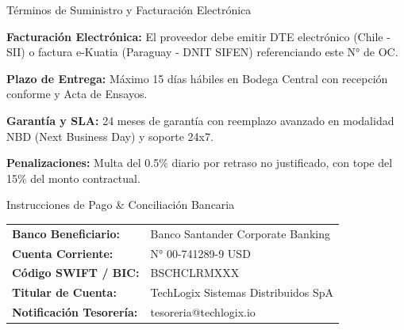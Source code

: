 \documentclass[10pt,letterpaper]{article}
\begin{document}
\vspace{0.15cm}


\vspace{0.2cm}

\noindent
\begin{minipage}[t]{0.52\textwidth}
  \begin{corpnote}{T\'erminos de Suministro y Facturaci\'on Electr\'onica}
    \begin{itemize}[leftmargin=*, noitemsep, topsep=1pt]
      {\scriptsize
      \item \textbf{Facturaci\'on Electr\'onica:} El proveedor debe emitir DTE electr\'onico (Chile - SII) o factura e-Kuatia (Paraguay - DNIT SIFEN) referenciando este N° de OC.
      \item \textbf{Plazo de Entrega:} M\'aximo 15 d\'ias h\'abiles en Bodega Central con recepci\'on conforme y Acta de Ensayos.
      \item \textbf{Garant\'ia y SLA:} 24 meses de garant\'ia con reemplazo avanzado en modalidad NBD (Next Business Day) y soporte 24x7.
      \item \textbf{Penalizaciones:} Multa del 0.5\% diario por retraso no justificado, con tope del 15\% del monto contractual.}
    \end{itemize}
  \end{corpnote}

  \vspace{0.15cm}

  \begin{corpcard}{Instrucciones de Pago \& Conciliaci\'on Bancaria}
    {\scriptsize\renewcommand{\arraystretch}{1.15}
    \begin{tabular}{@{}ll@{}}
      \textbf{Banco Beneficiario:} & Banco Santander Corporate Banking \\
      \textbf{Cuenta Corriente:} & N° 00-741289-9 USD \\
      \textbf{C\'odigo SWIFT / BIC:} & BSCHCLRMXXX \\
      \textbf{Titular de Cuenta:} & TechLogix Sistemas Distribuidos SpA \\
      \textbf{Notificaci\'on Tesorer\'ia:} & tesoreria@techlogix.io
    \end{tabular}}
  \end{corpcard}
\end{minipage}\hfill
\end{document}
